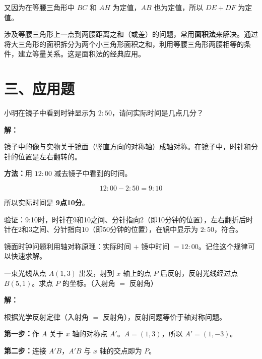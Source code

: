 \documentclass[12pt, a4paper]{ctexart}
\begin{document}
又因为在等腰三角形中 $BC$ 和 $AH$ 为定值，$AB$ 也为定值，所以 $DE + DF$ 为定值。

\begin{tipbox}[方法总结]
涉及等腰三角形上一点到两腰距离之和（或差）的问题，常用\textbf{面积法}来解决。通过将大三角形的面积拆分为两个小三角形面积之和，利用等腰三角形两腰相等的条件，建立等量关系。这是面积法的经典应用。
\end{tipbox}

\section*{\textcolor{apppurple}{三、应用题}}

\begin{appbox}
小明在镜子中看到时钟显示为 $2:50$，请问实际时间是几点几分？
\end{appbox}

\textbf{解：}

镜子中的像与实物关于镜面（竖直方向的对称轴）成轴对称。在镜子中，时针和分针的位置是左右翻转的。

\textbf{方法：}用 $12:00$ 减去镜子中看到的时间。

$$12:00 - 2:50 = 9:10$$

所以实际时间是 \textbf{9点10分}。

验证：9:10时，时针在9和10之间、分针指向2（即10分钟的位置），左右翻折后时针在2和3之间、分针指向10（即50分钟的位置），在镜中显示为 $2:50$，符合。

\begin{tipbox}[方法总结]
镜面时钟问题利用轴对称原理：实际时间 $+$ 镜中时间 $= 12:00$。记住这个规律可以快速求解。
\end{tipbox}

\begin{appbox}
一束光线从点 $A(1, 3)$ 出发，射到 $x$ 轴上的点 $P$ 后反射，反射光线经过点 $B(5, 1)$。求点 $P$ 的坐标。（入射角 $=$ 反射角）
\end{appbox}

\textbf{解：}

根据光学反射定律（入射角 $=$ 反射角），反射问题等价于轴对称问题。

\textbf{第一步：}作 $A$ 关于 $x$ 轴的对称点 $A'$。$A = (1, 3)$，所以 $A' = (1, -3)$。

\textbf{第二步：}连接 $A'B$，$A'B$ 与 $x$ 轴的交点即为 $P$。
\end{document}
